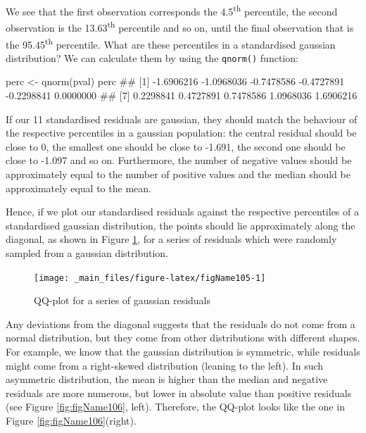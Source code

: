 \documentclass[a4paper,12pt,oneside]{book}
\newenvironment{Shaded}{\begin{snugshade}}{\end{snugshade}}
\newcommand{\DocumentationTok}[1]{#1}
\newcommand{\OtherTok}[1]{#1}
\newcommand{\FunctionTok}[1]{#1}
\newcommand{\NormalTok}[1]{#1}
\begin{document}
We see that the first observation corresponds the 4.5\textsuperscript{th} percentile, the second observation is the 13.63\textsuperscript{th} percentile and so on, until the final observation that is the 95.45\textsuperscript{th} percentile. What are these percentiles in a standardised gaussian distribution? We can calculate them by using the \texttt{qnorm()} function:

\begin{Shaded}
\begin{Highlighting}[]
\NormalTok{perc }\OtherTok{\textless{}{-}} \FunctionTok{qnorm}\NormalTok{(pval)}
\NormalTok{perc}
\DocumentationTok{\#\#  [1] {-}1.6906216 {-}1.0968036 {-}0.7478586 {-}0.4727891 {-}0.2298841  0.0000000}
\DocumentationTok{\#\#  [7]  0.2298841  0.4727891  0.7478586  1.0968036  1.6906216}
\end{Highlighting}
\end{Shaded}

If our 11 standardised residuals are gaussian, they should match the behaviour of the respective percentiles in a gaussian population: the central residual should be close to 0, the smallest one should be close to -1.691, the second one should be close to -1.097 and so on. Furthermore, the number of negative values should be approximately equal to the number of positive values and the median should be approximately equal to the mean.

Hence, if we plot our standardised residuals against the respective percentiles of a standardised gaussian distribution, the points should lie approximately along the diagonal, as shown in Figure \ref{fig:figName105}, for a series of residuals which were randomly sampled from a gaussian distribution.

\begin{figure}

{\centering \texttt{[image: \_main\_files/figure-latex/figName105-1]} 

}

\caption{QQ-plot for a series of gaussian residuals}\label{fig:figName105}
\end{figure}

Any deviations from the diagonal suggests that the residuals do not come from a normal distribution, but they come from other distributions with different shapes. For example, we know that the gaussian distribution is symmetric, while residuals might come from a right-skewed distribution (leaning to the left). In such asymmetric distribution, the mean is higher than the median and negative residuals are more numerous, but lower in absolute value than positive residuals (see Figure \ref{fig:figName106}, left). Therefore, the QQ-plot looks like the one in Figure \ref{fig:figName106}(right).
\end{document}
